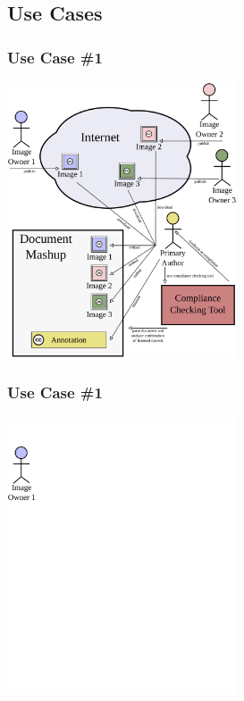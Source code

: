 \documentclass[mathserif,xcolor=dvipsnames,hyperref={bookmarks=true}]{beamer}
\begin{document}
    \subsection{Use Cases}

    \begin{frame}[t]
        \frametitle{Use Case \#1}
        \begin{center}
            \includegraphics[width=0.51\textwidth]{../resources/usecases/usecase1/usecase1-step27.pdf}
        \end{center}
    \end{frame}
    \begin{frame}[t]
        \frametitle{Use Case \#1}
        \begin{center}
            \includegraphics[width=0.51\textwidth]{../resources/usecases/usecase1/usecase1-step01.pdf}
        \end{center}
    \end{frame}
\end{document}
